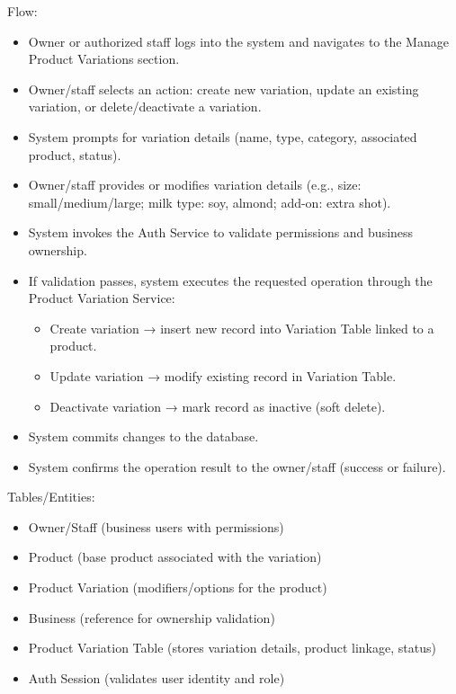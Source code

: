 \documentclass[]{VUMIFTemplateClass}
\begin{document}
Flow:
\begin{itemize}
\setlength{\itemsep}{2pt}
\setlength{\parskip}{0pt}
\setlength{\parsep}{0pt}
\item Owner or authorized staff logs into the system and navigates to the Manage Product Variations section.
\item Owner/staff selects an action: create new variation, update an existing variation, or delete/deactivate a variation.
\item System prompts for variation details (name, type, category, associated product, status).
\item Owner/staff provides or modifies variation details (e.g., size: small/medium/large; milk type: soy, almond; add-on: extra shot).
\item System invokes the Auth Service to validate permissions and business ownership.
\item If validation passes, system executes the requested operation through the Product Variation Service:
\begin{itemize}
\item Create variation → insert new record into Variation Table linked to a product.
\item Update variation → modify existing record in Variation Table.
\item Deactivate variation → mark record as inactive (soft delete).
\end{itemize}
\item System commits changes to the database.
\item System confirms the operation result to the owner/staff (success or failure).
\end{itemize}

Tables/Entities:
\begin{itemize}
\setlength{\itemsep}{2pt}
\setlength{\parskip}{0pt}
\setlength{\parsep}{0pt}
\item Owner/Staff (business users with permissions)
\item Product (base product associated with the variation)
\item Product Variation (modifiers/options for the product)
\item Business (reference for ownership validation)
\item Product Variation Table (stores variation details, product linkage, status)
\item Auth Session (validates user identity and role)
\end{itemize}
\end{document}
